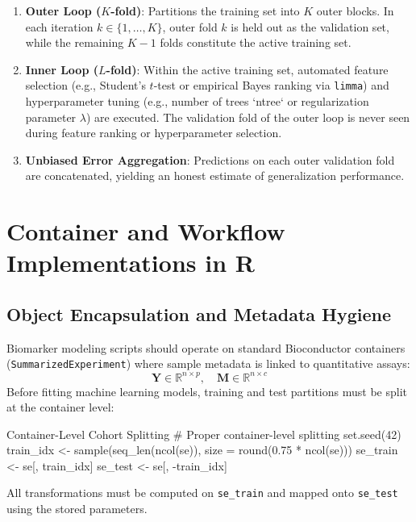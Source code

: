 \documentclass[11pt,twoside,openright]{book}
\begin{document}
\begin{enumerate}
    \item \textbf{Outer Loop ($K$-fold)}: Partitions the training set into $K$ outer blocks. In each iteration $k \in \{1, \dots, K\}$, outer fold $k$ is held out as the validation set, while the remaining $K-1$ folds constitute the active training set.
    \item \textbf{Inner Loop ($L$-fold)}: Within the active training set, automated feature selection (e.g., Student's $t$-test or empirical Bayes ranking via \texttt{limma}) and hyperparameter tuning (e.g., number of trees `ntree` or regularization parameter $\lambda$) are executed. The validation fold of the outer loop is never seen during feature ranking or hyperparameter selection.
    \item \textbf{Unbiased Error Aggregation}: Predictions on each outer validation fold are concatenated, yielding an honest estimate of generalization performance.
\end{enumerate}

\section{Container and Workflow Implementations in R}

\subsection{Object Encapsulation and Metadata Hygiene}

Biomarker modeling scripts should operate on standard Bioconductor containers (\texttt{SummarizedExperiment}) where sample metadata is linked to quantitative assays:
\begin{equation}
\mathbf{Y} \in \mathbb{R}^{n \times p}, \quad \mathbf{M} \in \mathbb{R}^{n \times c}
\end{equation}
Before fitting machine learning models, training and test partitions must be split at the container level:
\begin{rchunk}{Container-Level Cohort Splitting}
# Proper container-level splitting
set.seed(42)
train_idx <- sample(seq_len(ncol(se)), size = round(0.75 * ncol(se)))
se_train  <- se[, train_idx]
se_test   <- se[, -train_idx]
\end{rchunk}
All transformations must be computed on \texttt{se\_train} and mapped onto \texttt{se\_test} using the stored parameters.
\end{document}
